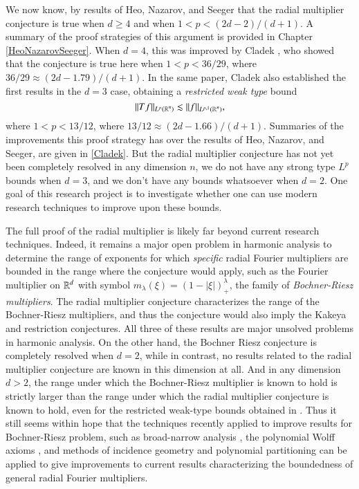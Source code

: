 We now know, by results of Heo, Nazarov, and Seeger \cite{HeoandNazarovandSeeger} that the radial multiplier conjecture is true when $d \geq 4$ and when $1 < p < (2d-2)/(d+1)$. A summary of the proof strategies of this argument is provided in Chapter \ref{HeoNazarovSeeger}. When $d = 4$, this was improved by Cladek \cite{Cladek}, who showed that the conjecture is true here when $1 < p < 36/29$, where $36/29 \approx (2d - 1.79)/(d+1)$. In the same paper, Cladek also established the first results in the $d = 3$ case, obtaining a \emph{restricted weak type} bound
% 
\[ \| Tf \|_{L^p(\operatorname{\mathbb{R}}^n)} \lesssim \| f \|_{L^{p,1}(\operatorname{\mathbb{R}}^n)}, \]
where $1 < p < 13/12$, where $13/12 \approx (2d - 1.66)/(d+1)$. Summaries of the improvements this proof strategy has over the results of Heo, Nazarov, and Seeger, are given in \ref{Cladek}. But the radial multiplier conjecture has not yet been completely resolved in any dimension $n$, we do not have any strong type $L^p$ bounds when $d = 3$, and we don't have any bounds whatsoever when $d = 2$. One goal of this research project is to investigate whether one can use modern research techniques to improve upon these bounds.

The full proof of the radial multiplier is likely far beyond current research techniques. Indeed, it remains a major open problem in harmonic analysis to determine the range of exponents for which \emph{specific} radial Fourier multipliers are bounded in the range where the conjecture would apply, such as the Fourier multiplier on $\operatorname{\mathbb{R}}^d$ with symbol $m_\lambda(\xi) = \left( 1 - |\xi| \right)^\lambda_+$, the family of \emph{Bochner-Riesz multipliers}. The radial multiplier conjecture characterizes the range of the Bochner-Riesz multipliers, and thus the conjecture would also imply the Kakeya and restriction conjectures. All three of these results are major unsolved problems in harmonic analysis. On the other hand, the Bochner Riesz conjecture is completely resolved when $d = 2$, while in contrast, no results related to the radial multiplier conjecture are known in this dimension at all. And in any dimension $d > 2$, the range under which the Bochner-Riesz multiplier is known to hold \cite{GuoandOhandWangandWuandZhang} is strictly larger than the range under which the radial multiplier conjecture is known to hold, even for the restricted weak-type bounds obtained in \cite{Cladek}. Thus it still seems within hope that the techniques recently applied to improve results for Bochner-Riesz problem, such as broad-narrow analysis \cite{BourgainandGuth}, the polynomial Wolff axioms \cite{KatzandRogers}, and methods of incidence geometry and polynomial partitioning \cite{Zahl2} can be applied to give improvements to current results characterizing the boundedness of general radial Fourier multipliers.

